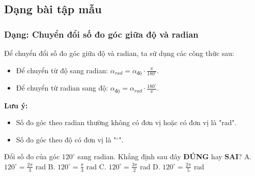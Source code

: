 

\subsection{Dạng bài tập mẫu}
\subsubsection{Dạng: Chuyển đổi số đo góc giữa độ và radian}
\begin{phuongphap}
Để chuyển đổi số đo góc giữa độ và radian, ta sử dụng các công thức sau:
\begin{itemize}
    \item Để chuyển từ độ sang radian: $ \alpha_{rad} = \alpha_{độ} \cdot \frac{\pi}{180^\circ} $.
    \item Để chuyển từ radian sang độ: $ \alpha_{độ} = \alpha_{rad} \cdot \frac{180^\circ}{\pi} $.
\end{itemize}
\textbf{Lưu ý:}
\begin{itemize}
    \item Số đo góc theo radian thường không có đơn vị hoặc có đơn vị là "rad".
    \item Số đo góc theo độ có đơn vị là "$^\circ$".
\end{itemize}
\end{phuongphap}
\begin{vidumau}
Đổi số đo của góc $120^\circ$ sang radian. Khẳng định sau đây \textbf{ĐÚNG} hay $\textbf{SAI}$?
\choice
A. $120^\circ = \frac{2\pi}{3}$ rad \True
B. $120^\circ = \frac{\pi}{3}$ rad
C. $120^\circ = \frac{3\pi}{2}$ rad
D. $120^\circ = \frac{2\pi}{5}$ rad
\end{vidumau}

